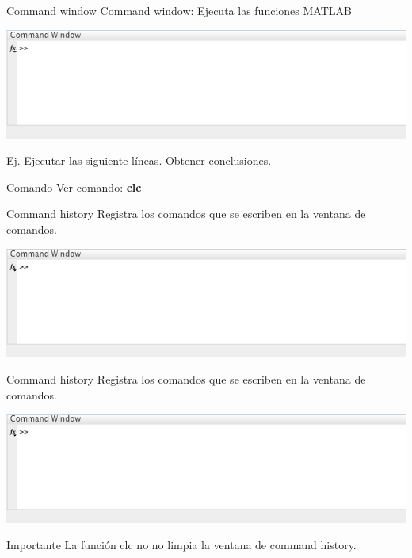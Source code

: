 \documentclass{bredelebeamer}
\begin{document}
\begin{frame}{Command window}
Command window: Ejecuta las funciones MATLAB\\
\begin{center}
\includegraphics[scale=0.3]{images/pantalla2.png}
\end{center}
Ej. Ejecutar las siguiente líneas. Obtener conclusiones.

\begin{exampleblock}{Comando}
Ver comando: \textbf{clc}
\end{exampleblock}
\end{frame}

\begin{frame}{Command history}
Registra los comandos que se escriben en la ventana de comandos.
\begin{center}
\includegraphics[scale=0.3]{images/pantalla2.png}
\end{center}
\end{frame}

\begin{frame}{Command history}
Registra los comandos que se escriben en la ventana de comandos.
\begin{center}
\includegraphics[scale=0.3]{images/pantalla2.png}
\end{center}
\begin{alertblock}{Importante}
La función clc no no limpia la ventana de command history.
\end{alertblock}
\end{frame}
\end{document}
